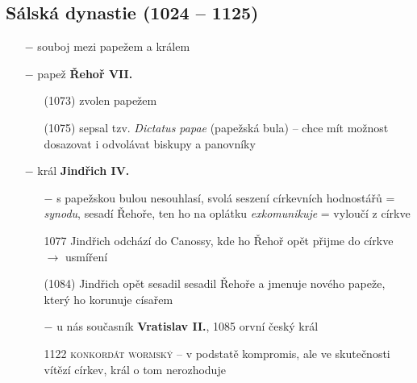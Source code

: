 \documentclass{article}
\begin{document}
\subsection*{Sálská dynastie (1024 -- 1125)}
\begin{itemize}
    \vspace{-0.5em}
    \setlength\itemsep{0.15em}
    \item[$-$] souboj mezi papežem a králem
    \item[$-$] papež \textbf{Řehoř VII.}
        \begin{itemize}
            \vspace{-0.5em}
            \setlength\itemsep{0.15em}
            \item[(1073)] zvolen papežem
            \item[(1075)] sepsal tzv. \textit{Dictatus papae} (papežská bula) -- chce mít možnost dosazovat i odvolávat biskupy a panovníky
        \end{itemize}
    \item[$-$] král \textbf{Jindřich IV.}
        \begin{itemize}
            \vspace{-0.5em}
            \setlength\itemsep{0.15em}
            \item[$-$] s papežskou bulou nesouhlasí, svolá seszení církevních hodnostářů = \textit{synodu}, sesadí Řehoře, ten ho na oplátku \textit{exkomunikuje} = vyloučí z církve
            \item[1077] Jindřich odchází do Canossy, kde ho Řehoř opět přijme do církve $\rightarrow$ usmíření
            \item[(1084)] Jindřich opět sesadil sesadil Řehoře a jmenuje nového papeže, který ho korunuje císařem
            \item[$-$] u nás současník \textbf{Vratislav II.}, 1085 orvní český král
            \item[1122] \textsc{konkordát wormský} -- v podstatě kompromis, ale ve skutečnosti vítězí církev, král o tom nerozhoduje
        \end{itemize}
\end{itemize}
\end{document}

